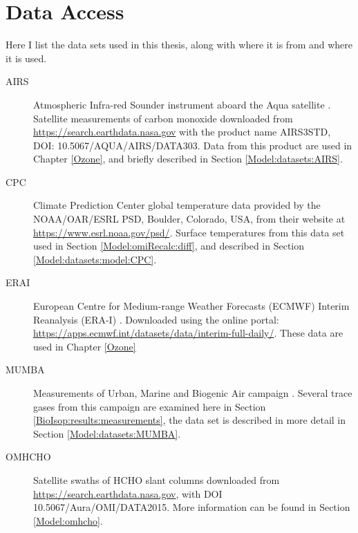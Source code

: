 {  %
     
\section{Data Access}
  \label{Model:DataAccess}
  
  Here I list the data sets used in this thesis, along with where it is from and where it is used.
  
  \begin{description}
    \item[AIRS] Atmospheric Infra-red Sounder instrument aboard the Aqua satellite \parencite{AIRS3STD}.
    Satellite measurements of carbon monoxide downloaded from \url{https://search.earthdata.nasa.gov} with the product name AIRS3STD, DOI: 10.5067/AQUA/AIRS/DATA303.
    Data from this product are used in Chapter \ref{Ozone}, and briefly described in Section \ref{Model:datasets:AIRS}.
    
    \item[CPC] Climate Prediction Center global temperature data provided by the NOAA/OAR/ESRL PSD, Boulder, Colorado, USA, from their website at \url{https://www.esrl.noaa.gov/psd/}.
    Surface temperatures from this data set used in Section \ref{Model:omiRecalc:diff}, and described in Section \ref{Model:datasets:model:CPC}.
    
    \item[ERAI] European Centre for Medium-range Weather Forecasts (ECMWF) Interim Reanalysis (ERA-I) \parencite{Dee2011}. 
    Downloaded using the online portal: \url{https://apps.ecmwf.int/datasets/data/interim-full-daily/}.
    These data are used in Chapter \ref{Ozone}
    
    \item[MUMBA] Measurements of Urban, Marine and Biogenic Air campaign \parencite{PatonWalsh2017}.
    Several trace gases from this campaign are examined here in Section \ref{BioIsop:results:measurements}, the data set is described in more detail in Section \ref{Model:datasets:MUMBA}.
    
    
    \item[OMHCHO] Satellite swaths of HCHO slant columns downloaded from \url{https://search.earthdata.nasa.gov}, with DOI 10.5067/Aura/OMI/DATA2015.
    More information can be found in Section \ref{Model:omhcho}.
    

\end{description}}
